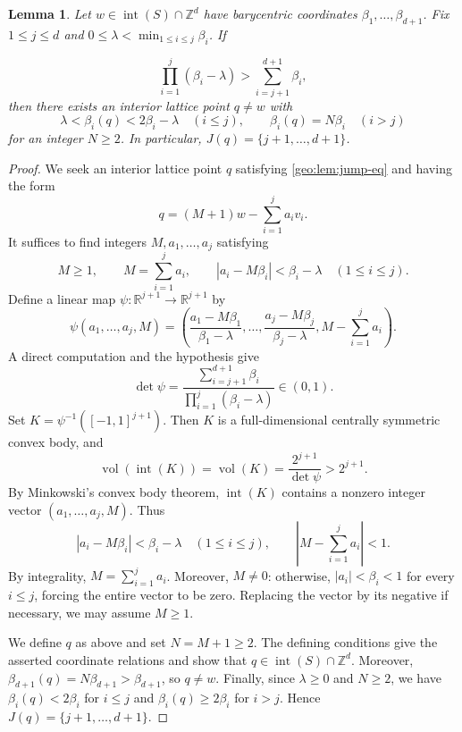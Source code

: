 \documentclass[reqno, 11pt]{article}
\numberwithin{equation}{section}
\newtheorem{lemma}[lemma]{Lemma}
\theoremstyle{definition}
\begin{document}
\begin{lemma}\label{geo:lem:jump}
Let \(w\in\operatorname{int}(S)\cap\mathbb Z^d\) have barycentric coordinates \(\beta_1,\ldots,\beta_{d+1}\).
Fix $1\le j\le d$ and $0\le\lambda<\min_{1\le i\le j}\beta_i$. If

\[
 \prod_{i=1}^j(\beta_i-\lambda)>
 \sum_{i=j+1}^{d+1}\beta_i,
\]
then there exists an interior lattice point $q\ne w$ with
\begin{equation}\label{geo:lem:jump-eq}
 \lambda<\beta_i(q)<2\beta_i-\lambda\quad(i\le j),
 \qquad \beta_i(q)=N\beta_i\quad(i>j)
\end{equation}
for an integer $N\ge2$. In particular,
$J(q)=\{j+1,\ldots,d+1\}$.
\end{lemma}
\begin{proof}
We seek an interior lattice point $q$ satisfying \eqref{geo:lem:jump-eq} and having the form
\[
q=(M+1)w-\sum_{i=1}^{j}a_iv_i.
\]
It suffices to find integers $M,a_1,\ldots,a_j$ satisfying
\[
M\ge1,\qquad
M=\sum_{i=1}^{j}a_i,\qquad
|a_i-M\beta_i|<\beta_i-\lambda
\quad (1\le i\le j).
\]
Define a linear map
$\psi:\mathbb{R}^{j+1}\to\mathbb{R}^{j+1}$ by
\[
\psi(a_1,\ldots,a_j,M)
=
\left(
\frac{a_1-M\beta_1}{\beta_1-\lambda},
\ldots,
\frac{a_j-M\beta_j}{\beta_j-\lambda},
M-\sum_{i=1}^{j}a_i
\right).
\]
A direct computation and the hypothesis give
\[
\det\psi
=
\frac{\sum_{i=j+1}^{d+1}\beta_i}
     {\prod_{i=1}^{j}(\beta_i-\lambda)}
\in(0,1).
\]
Set $K=\psi^{-1}([-1,1]^{j+1})$.
Then \(K\) is a full-dimensional centrally symmetric convex body,
and
\[
\operatorname{vol}(\operatorname{int}(K))
=\operatorname{vol}(K)
=\frac{2^{j+1}}{\det\psi}
>2^{j+1}.
\]
By Minkowski's convex body theorem, $\operatorname{int}(K)$
contains a nonzero integer vector $(a_1,\ldots,a_j,M)$.
Thus
\[
|a_i-M\beta_i|<\beta_i-\lambda
\quad (1\le i\le j),
\qquad
\left|M-\sum_{i=1}^{j}a_i\right|<1.
\]
By integrality, $M=\sum_{i=1}^{j}a_i$.
Moreover, $M\ne0$: otherwise, $|a_i|<\beta_i<1$ for every
$i\le j$, forcing the entire vector to be zero.
Replacing the vector by its negative if necessary,
we may assume $M\ge1$.

We define $q$ as above and set $N=M+1\ge2$.
The defining conditions give the asserted coordinate relations
and show that $q\in\operatorname{int}(S)\cap\mathbb{Z}^d$.
Moreover, $\beta_{d+1}(q)=N\beta_{d+1}>\beta_{d+1}$,
so $q\ne w$.
Finally, since $\lambda\ge0$ and $N\ge2$, we have
$\beta_i(q)<2\beta_i$ for $i\le j$ and
$\beta_i(q)\ge2\beta_i$ for $i>j$. Hence $J(q)=\{j+1,\ldots,d+1\}.$
\end{proof}
\end{document}
